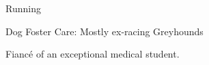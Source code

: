 

\begin{cvitems}

	\vspace{4.0mm}
  	\item
    {Running}
	\item
	{Dog Foster Care: Mostly ex-racing Greyhounds}
	\item
	{Fiancé of an exceptional medical student.}


\end{cvitems}
